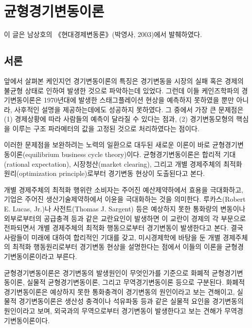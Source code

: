 \chapter{균형경기변동이론}

\begin{flushright}
\small\sffamily 이 글은 남상호의 《현대경제변동론》(박영사, 2003)에서 발췌하였다.
\end{flushright}


\section{서론}

앞에서 살펴본 케인지언 경기변동이론의 특징은
경기변동을 시장의 실패 혹은 경제의 불균형 상태로 인하여 발생한
것으로 파악하는데 있었다. 그런데 이들 케인즈학파의 경기변동이론은 1970년대에
발생한 스태그플레이션 현상을 예측하지 못하였을 뿐만 아니라,
사후적인 설명을 제공하는데에도 성공하지 못하였다.
그 중에서 가장 큰 문제점은 (1) 경제상황에 따라 사람들의 예측이
달라질 수 있다는 점과, (2) 경기변동모형의 핵심을 이루는 구조
파라메터의 값을 고정된 것으로 처리하였다는 점이다.

이러한 문제점을 보완하려는 노력의 일환으로 대두된 새로운 이론이
바로 균형경기변동이론(equilibrium business cycle theory)이다.
균형경기변동이론은 합리적 기대(rational expectation),
시장청산(market clearing), 그리고 개별  경제주체의
최적화 원리(optimization principle)로부터 경기변동 현상이 도출된다고 본다.

개별  경제주체의 최적화 행위란 소비자는 주어진 예산제약하에서
효용을 극대화하고, 기업은 주어진 생산기술제약하에서 이윤을
극대화하는 것을 의미한다. 루카스(Robert E. Lucas, Jr.)나
사전트(Thomas J. Sargent) 등은 예상하지 못한 통화량의 변동이나
외부로부터의 공급충격 등과 같은 교란요인이 발생하면 이 교란이
경제의 각 부문으로 전파되면서 개별 경제주체의 최적화 행동으로부터
경기변동이 발생한다고 본다. 결국 사람들이 미래에 대하여 합리적인
기대를 갖고, 미시경제학에 바탕을 둔 개별  경제주체의 최적화
행동원리로부터 경기변동 현상을 설명한다는 점에서 이들의 이론을
균형경기변동이론이라고 부른다.

균형경기변동이론은 경기변동의 발생원인이 무엇인가를 기준으로
화폐적 균형경기변동이론, 실물적 균형경기변동이론, 그리고 무역경기변동이론
등으로 구분된다.
화폐적 경기변동이론은 예상하지 못한 통화충격이 경기변동의 원인이라고 보는 견해이고,
실물적 경기변동이론은 생산성 충격이나 석유파동 등과 같은 실물적 요인을
경기변동의 원인이라고 보며, 외국과의 무역으로부터 경기변동이 발생한다고 보는
견해가 무역경기변동이론이다.

